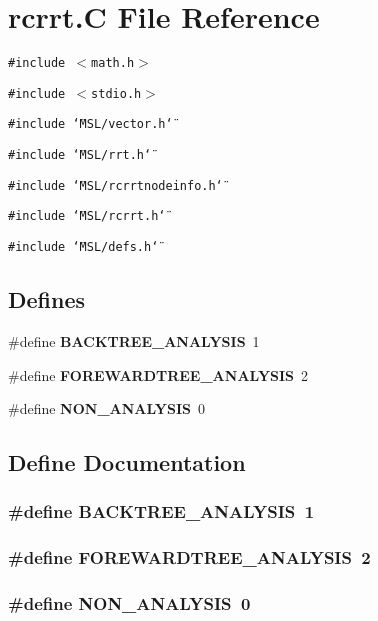 \section{rcrrt.C File Reference}
\label{rcrrt_8C}
{\tt \#include $<$math.h$>$}\par
{\tt \#include $<$stdio.h$>$}\par
{\tt \#include \char`\"{}MSL/vector.h\char`\"{}}\par
{\tt \#include \char`\"{}MSL/rrt.h\char`\"{}}\par
{\tt \#include \char`\"{}MSL/rcrrtnodeinfo.h\char`\"{}}\par
{\tt \#include \char`\"{}MSL/rcrrt.h\char`\"{}}\par
{\tt \#include \char`\"{}MSL/defs.h\char`\"{}}\par
\subsection*{Defines}
\begin{CompactItemize}
\item 
\#define {\bf BACKTREE\_\-ANALYSIS}\ 1
\item 
\#define {\bf FOREWARDTREE\_\-ANALYSIS}\ 2
\item 
\#define {\bf NON\_\-ANALYSIS}\ 0
\end{CompactItemize}


\subsection{Define Documentation}
\subsubsection{\setlength{\rightskip}{0pt plus 5cm}\#define BACKTREE\_\-ANALYSIS\ 1}\label{rcrrt_8C_a0}


\subsubsection{\setlength{\rightskip}{0pt plus 5cm}\#define FOREWARDTREE\_\-ANALYSIS\ 2}\label{rcrrt_8C_a1}


\subsubsection{\setlength{\rightskip}{0pt plus 5cm}\#define NON\_\-ANALYSIS\ 0}\label{rcrrt_8C_a2}


